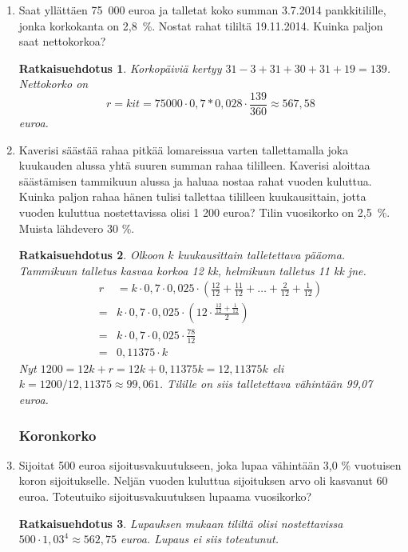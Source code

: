\documentclass[a4paper,10pt,twoside]{article}
\newtheorem*{ratkaisu}{Ratkaisuehdotus}
\begin{document}
\begin{enumerate}
\item Saat yllättäen 75~000 euroa ja talletat koko summan 3.7.2014 pankkitilille, jonka korkokanta on 2{,}8~\%.
Nostat rahat tililtä 19.11.2014. Kuinka paljon saat nettokorkoa?
\begin{ratkaisu}
    Korkopäiviä kertyy \(31-3+31+30+31+19 = 139\). Nettokorko on
    \[
        r = kit = 75000\cdot0,7*0,028\cdot\frac{139}{360}\approx 567,58
    \]
    euroa.
\end{ratkaisu}

\item Kaverisi säästää rahaa pitkää lomareissua varten tallettamalla joka kuukauden alussa yhtä suuren summan rahaa tililleen.
Kaverisi aloittaa säästämisen tammikuun alussa ja haluaa nostaa rahat vuoden kuluttua.
Kuinka paljon rahaa hänen tulisi tallettaa tililleen kuukausittain, jotta vuoden kuluttua nostettavissa olisi 1 200 euroa?
Tilin vuosikorko on 2{,}5~\%. Muista lähdevero 30 \%.
\begin{ratkaisu}
    Olkoon \(k\) kuukausittain talletettava pääoma. Tammikuun talletus kasvaa korkoa 12 kk, helmikuun talletus 11 kk jne.
    \begin{align*}
        r &= k\cdot0,7\cdot0,025\cdot\left(\frac{12}{12} + \frac{11}{12} + \ldots + \frac{2}{12} + \frac{1}{12}\right)\\
         =& k\cdot0,7\cdot0,025\cdot\left(12\cdot\frac{\frac{12}{12} + \frac{1}{12}}{2}\right)\\
         =& k\cdot0,7\cdot0,025\cdot\frac{78}{12}\\
         =& 0,11375\cdot k
    \end{align*}
    Nyt \(1200 = 12k + r = 12k + 0,11375k = 12,11375k\) eli \(k = 1200/12,11375\approx 99,061\).
    Tilille on siis talletettava vähintään 99,07 euroa.
\end{ratkaisu}

\subsubsection*{Koronkorko}

\item Sijoitat 500 euroa sijoitusvakuutukseen, joka lupaa vähintään 3{,}0 \% vuotuisen koron sijoitukselle.
Neljän vuoden kuluttua sijoituksen arvo oli kasvanut 60 euroa. Toteutuiko sijoitusvakuutuksen lupaama vuosikorko?
\begin{ratkaisu}
    Lupauksen mukaan tililtä olisi nostettavissa \(500\cdot1,03^4\approx562,75\) euroa. Lupaus ei siis toteutunut.
\end{ratkaisu}


\end{enumerate}
\end{document}

